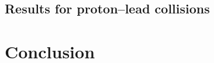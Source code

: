 \documentclass[main.tex]{subfiles}
\begin{document}
\subsection{Results for proton--lead collisions}

\section{Conclusion}

\end{document}
